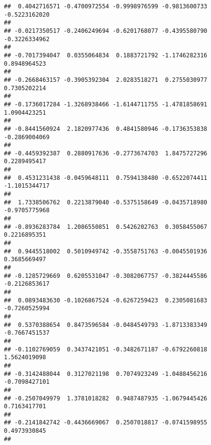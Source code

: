 \documentclass[]{article}
\begin{document}
\begin{verbatim}
##  0.4042716571 -0.4700972554 -0.9998976599 -0.9813600733 -0.5223162020 
##                                                                       
## -0.0217350517 -0.2406249694 -0.6201768077 -0.4395580790 -0.3226334962 
##                                                                       
## -0.7017394047  0.0355064834  0.1883721792 -1.1746282316  0.8948964523 
##                                                                       
## -0.2668463157 -0.3905392304  2.0283518271  0.2755030977  0.7305202214 
##                                                                       
## -0.1736017284 -1.3268938466 -1.6144711755 -1.4781858691  1.0904423251 
##                                                                       
## -0.8441560924  2.1820977436  0.4841580946 -0.1736353838 -0.2869004069 
##                                                                       
## -0.4459392387  0.2880917636 -0.2773674703  1.8475727296  0.2289495417 
##                                                                       
##  0.4531231438 -0.0459648111  0.7594138480 -0.6522074411 -1.1015344717 
##                                                                       
##  1.7338506762  0.2213879040 -0.5375158649 -0.0435718980 -0.9705775968 
##                                                                       
## -0.8936283784  1.2086550851  0.5426202763  0.3058455067  0.2216895351 
##                                                                       
##  0.9445518002  0.5010949742 -0.3558751763 -0.0045501936  0.3685669497 
##                                                                       
## -0.1285729669  0.6205531047 -0.3082067757 -0.3824445586 -0.2126853617 
##                                                                       
##  0.0893483630 -0.1026867524 -0.6267259423  0.2305081683 -0.7260525994 
##                                                                       
##  0.5370388654  0.8473596584 -0.0484549793 -1.8713383349 -0.7667451537 
##                                                                       
## -0.1102769059  0.3437421051 -0.3482671187 -0.6792260818  1.5624019098 
##                                                                       
## -0.3142488044  0.3127021198  0.7074923249 -1.0488456216 -0.7098427101 
##                                                                       
## -0.2507049979  1.3781018282  0.9487487935 -1.0679445426  0.7163417701 
##                                                                       
## -0.2141842742 -0.4436669067  0.2507018817 -0.0741598955  0.4973930845 
##                                                                       

\end{verbatim}
\end{document}
